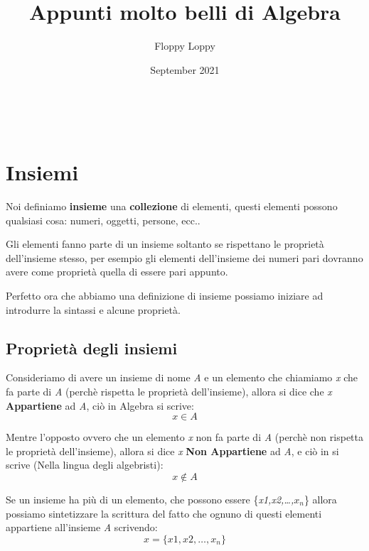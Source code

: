 \documentclass{article}
\theoremstyle{definition}
\begin{document}
\title{Appunti molto belli di Algebra}
\author{Floppy Loppy}
\date{September 2021}
\maketitle
\tableofcontents
\newpage
\listoftodos\






\newpage
\section{Insiemi}
Noi definiamo \textbf{insieme} una \textbf{collezione} di elementi, questi elementi possono qualsiasi cosa: numeri, oggetti, persone, ecc.. \par
Gli elementi fanno parte di un insieme soltanto se rispettano le proprietà dell'insieme stesso, per esempio gli elementi dell'insieme dei numeri pari dovranno avere come proprietà quella di essere pari appunto. \par
Perfetto ora che abbiamo una definizione di insieme possiamo iniziare ad introdurre la sintassi e alcune proprietà.


\subsection{Proprietà degli insiemi}
Consideriamo di avere un insieme di nome \textit{A} e un elemento che chiamiamo \textit{x} che fa parte di \textit{A} (perchè rispetta le proprietà dell'insieme), allora si dice che \textit{x} \textbf{Appartiene} ad \textit{A}, ciò in Algebra si scrive:
\begin{equation}
        x \in A
\end{equation}

Mentre l'opposto ovvero che un elemento \textit{x} non fa parte di \textit{A} (perchè non rispetta le proprietà dell'insieme), allora si dice \textit{x} \textbf{Non Appartiene} ad \textit{A}, e ciò in si scrive (Nella lingua degli algebristi):
\begin{equation}
        x \not \in A
\end{equation}

Se un insieme ha più di un elemento, che possono essere \{\textit{x1,x2,\ldots,$x_n$}\} allora possiamo sintetizzare la scrittura del fatto che ognuno di questi elementi appartiene all'insieme \textit{A} scrivendo:
\begin{equation}
        x = \{x1,x2,\ldots,x_n\} 
\end{equation}
\end{document}
